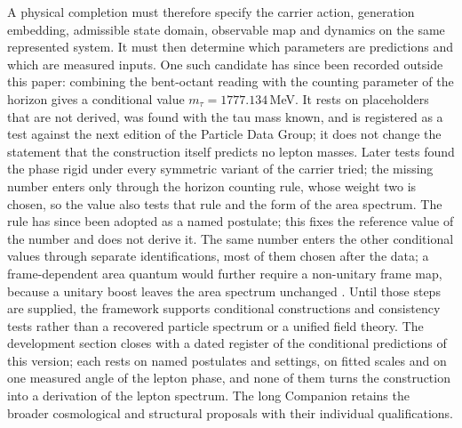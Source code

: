 A physical completion must therefore specify the carrier action,
generation embedding, admissible state domain, observable map and
dynamics on the same represented system. It must then determine which
parameters are predictions and which are measured inputs. One such
candidate has since been recorded outside this paper: combining the
bent-octant reading with the counting parameter of the horizon gives a
conditional value $m_\tau=1777.134$\,MeV. It rests on placeholders that are
not derived, was found with the tau mass known, and is registered as a
test against the next edition of the Particle Data Group; it does not
change the statement that the construction itself predicts no lepton
masses. Later tests found the phase rigid under every symmetric
variant of the carrier tried; the missing number enters only through
the horizon counting rule, whose weight two is chosen, so the value
also tests that rule and the form of the area spectrum. The rule has
since been adopted as a named postulate; this fixes the reference
value of the number and does not derive it. The same
number enters the other conditional values through separate
identifications, most of them chosen after the data; a frame-dependent
area quantum would further require a non-unitary frame map, because a
unitary boost leaves the area spectrum unchanged
\cite{RovelliSpeziale2003}. Until those
steps are supplied, the framework supports conditional constructions
and consistency tests rather than a recovered particle spectrum or
a unified field theory. The development section closes with a dated
register of the conditional predictions of this version; each rests on
named postulates and settings, on fitted scales and on one measured
angle of the lepton phase, and none of them turns the construction into
a derivation of the lepton spectrum. The long Companion retains the broader
cosmological and structural proposals with their individual qualifications.
